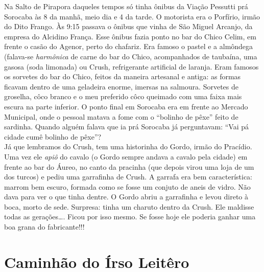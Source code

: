\documentclass[12pt,brazil,]{book}
\begin{document}
Na Salto de Pirapora daqueles tempos só tinha ônibus da Viação Pessutti
prá Sorocaba às 8 da manhã, meio dia e 4 da tarde. O motorista era o
Porfírio, irmão do Dito Frango. Às 9:15 passava o ônibus que vinha de
São Miguel Arcanjo, da empresa do Alcidino França. Esse ônibus fazia
ponto no bar do Chico Celim, em frente o casão do Agenor, perto do
chafariz. Era famoso o pastel e a almôndega (falava-se \emph{harmônica}
de carne do bar do Chico, acompanhados de taubaína, uma gasosa (soda
limonada) ou Crush, refrigerante artificial de laranja. Eram famosos os
sorvetes do bar do Chico, feitos da maneira artesanal e antiga: as
formas ficavam dentro de uma geladeira enorme, imersas na salmoura.
Sorvetes de groselha, côco branco e o meu preferido côco queimado com
uma faixa mais escura na parte inferior. O ponto final em Sorocaba era
em frente ao Mercado Municipal, onde o pessoal matava a fome com o
``bolinho de pêxe'' feito de sardinha. Quando alguém falava que ia prá
Sorocaba já perguntavam: ``Vai pá cidade cumê bolinho de pêxe''?\\
Já que lembramos do Crush, tem uma historinha do Gordo, irmão do
Pracídio. Uma vez ele \emph{apiô} do cavalo (o Gordo sempre andava a
cavalo pela cidade) em frente ao bar do Áureo, no canto da pracinha (que
depois virou uma loja de um dos turcos) e pediu uma garrafinha de Crush.
A garrafa era bem característica: marrom bem escuro, formada como se
fosse um conjuto de aneis de vidro. Não dava para ver o que tinha
dentre. O Gordo abriu a garrafinha e levou direto à boca, morto de sede.
Surpresa: tinha um charuto dentro da Crush. Ele maldisse todas as
gerações\ldots{}. Ficou por isso mesmo. Se fosse hoje ele poderia ganhar
uma boa grana do fabricante!!!

\section{Caminhão do Írso
Leitêro}\label{caminhuxe3o-do-uxedrso-leituxearo}
\end{document}
